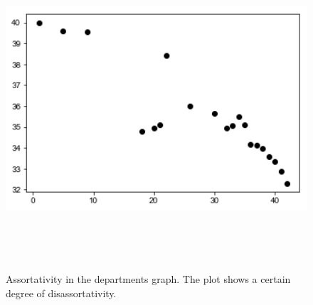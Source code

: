 \documentclass{report}
\theoremstyle{definition}
\theoremstyle{remark}
\begin{document}
 \begin{figure} [H]
 	\centering
 	\centerline{\includegraphics[width = 13cm, height = 12cm, keepaspectratio]{assortativity_dep.png}}
 	\label{Ass_dep}
 	\caption{Assortativity in the departments graph. The plot shows a certain degree of disassortativity.}
 \end{figure}
\end{document}

